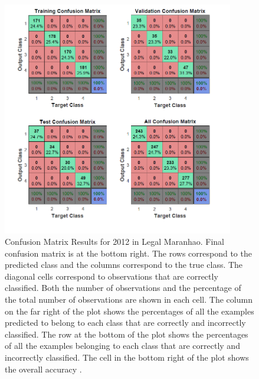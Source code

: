 \begin{figure}[htpb]
 \centering
\includegraphics[width=0.9\textwidth]{Chapter2/2005_CM_Mai_ML_N.png}
\caption[Confusion Matrix Results for 2012 in Legal Maranhao]{Confusion Matrix Results for 2012 in Legal Maranhao. Final confusion matrix is at the bottom right. The rows correspond to the predicted class and the columns correspond to the true class. The diagonal cells correspond to observations that are correctly classified. Both the number of observations and the percentage of the total number of observations are shown in each cell. The column on the far right of the plot shows the percentages of all the examples predicted to belong to each class that are correctly and incorrectly classified. The row at the bottom of the plot shows the percentages of all the examples belonging to each class that are correctly and incorrectly classified. The cell in the bottom right of the plot shows the overall accuracy \citep{matlab_2017}.}
\end{figure}

